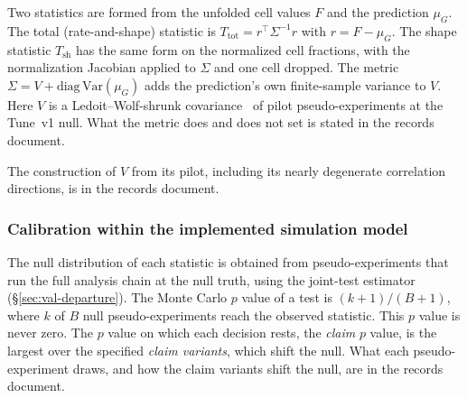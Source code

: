Two statistics are formed from the unfolded cell values $F$ and the prediction $\mu_{G}$. The total (rate-and-shape) statistic is $T_{\mathrm{tot}}=r^{\top}\Sigma^{-1}r$ with $r=F-\mu_{G}$. The shape statistic $T_{\mathrm{sh}}$ has the same form on the normalized cell fractions, with the normalization Jacobian applied to $\Sigma$ and one cell dropped. The metric $\Sigma=V+\mathrm{diag}\,\mathrm{Var}(\mu_{G})$ adds the prediction's own finite-sample variance to $V$. Here $V$ is a Ledoit--Wolf-shrunk covariance~\cite{LedoitWolf:2004} of \jtVn{} pilot pseudo-experiments at the Tune~v1 null. What the metric does and does not set is stated in the records document.

The construction of $V$ from its pilot, including its nearly degenerate correlation directions, is in the records document.

\subsubsection{Calibration within the implemented simulation model}
\label{sec:joint5d-calibration}

The null distribution of each statistic is obtained from pseudo-experiments that run the full analysis chain at the null truth, using the joint-test estimator (\S\ref{sec:val-departure}). The Monte Carlo $p$ value of a test is $(k+1)/(B+1)$, where $k$ of $B$ null pseudo-experiments reach the observed statistic. This $p$ value is never zero. The $p$ value on which each decision rests, the \emph{claim} $p$ value, is the largest over the specified \emph{claim variants}, which shift the null. What each pseudo-experiment draws, and how the claim variants shift the null, are in the records document.

